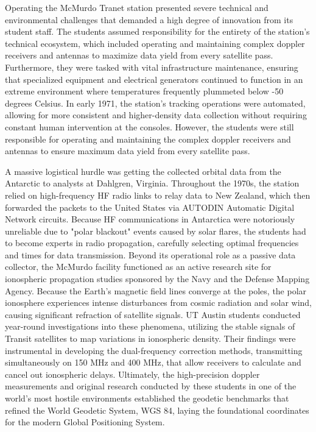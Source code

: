 Operating the McMurdo Tranet station presented severe technical and environmental challenges that demanded a high degree of innovation from its student staff. The students assumed responsibility for the entirety of the station's technical ecosystem, which included operating and maintaining complex doppler receivers and antennas to maximize data yield from every satellite pass. Furthermore, they were tasked with vital infrastructure maintenance, ensuring that specialized equipment and electrical generators continued to function in an extreme environment where temperatures frequently plummeted below -50 degrees Celsius. In early 1971, the station's tracking operations were automated, allowing for more consistent and higher-density data collection without requiring constant human intervention at the consoles. However, the students were still responsible for operating and maintaining the complex doppler receivers and antennas to ensure maximum data yield from every satellite pass. 

A massive logistical hurdle was getting the collected orbital data from the Antarctic to analysts at Dahlgren, Virginia. Throughout the 1970s, the station relied on high-frequency HF radio links to relay data to New Zealand, which then forwarded the packets to the United States via AUTODIN Automatic Digital Network circuits. Because HF communications in Antarctica were notoriously unreliable due to "polar blackout" events caused by solar flares, the students had to become experts in radio propagation, carefully selecting optimal frequencies and times for data transmission.
Beyond its operational role as a passive data collector, the McMurdo facility functioned as an active research site for ionospheric propagation studies sponsored by the Navy and the Defense Mapping Agency. Because the Earth's magnetic field lines converge at the poles, the polar ionosphere experiences intense disturbances from cosmic radiation and solar wind, causing significant refraction of satellite signals. UT Austin students conducted year-round investigations into these phenomena, utilizing the stable signals of Transit satellites to map variations in ionospheric density. Their findings were instrumental in developing the dual-frequency correction methods, transmitting simultaneously on 150 MHz and 400 MHz, that allow receivers to calculate and cancel out ionospheric delays. Ultimately, the high-precision doppler measurements and original research conducted by these students in one of the world's most hostile environments established the geodetic benchmarks that refined the World Geodetic System, WGS 84, laying the foundational coordinates for the modern Global Positioning System.

